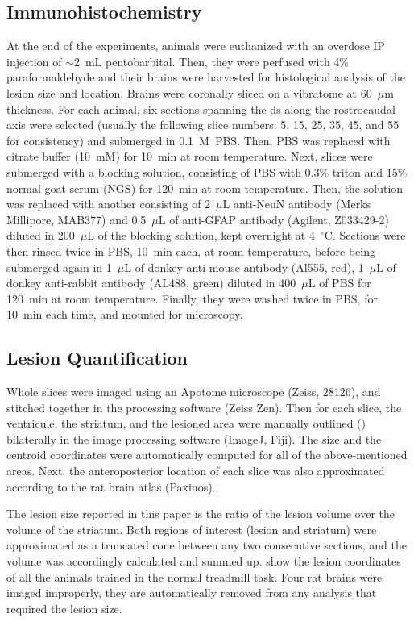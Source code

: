 \subsection{Immunohistochemistry}
At the end of the experiments, animals were euthanized with an overdose IP injection of $\sim$2~mL pentobarbital.
Then, they were perfused with 4\% paraformaldehyde and their brains were harvested for histological analysis of the lesion size and location.
Brains were coronally sliced on a vibratome at 60~$\mu$m thickness.
For each animal, six sections spanning the \gls{ds} along the rostrocaudal axis were selected (usually the following slice numbers: 5, 15, 25, 35, 45, and 55 for consistency) and submerged in 0.1~M~PBS.
Then, PBS was replaced with citrate buffer (10~mM) for 10~min at room temperature.
Next, slices were submerged with a blocking solution, consisting of PBS with 0.3\% triton and 15\% normal goat serum (NGS) for 120~min at room temperature.
Then, the solution was replaced with another consisting of 2~$\mu$L anti-NeuN antibody (Merks Millipore, MAB377) and 0.5~$\mu$L of anti-GFAP antibody (Agilent, Z033429-2) diluted in 200~$\mu$L of the blocking solution, kept overnight at 4~$^{\circ}$C.
Sections were then rinsed twice in PBS, 10~min each, at room temperature, before being submerged again in 1~$\mu$L of donkey anti-mouse antibody (Al555, red), 1~$\mu$L of donkey anti-rabbit antibody (AL488, green) diluted in 400~$\mu$L of PBS for 120~min at room temperature.
Finally, they were washed twice in PBS, for 10~min each time, and mounted for microscopy.

\subsection{Lesion Quantification}
Whole slices were imaged using an Apotome microscope (Zeiss, 28126), and stitched together in the processing software (Zeiss Zen).
Then for each slice, the ventricule, the striatum, and the lesioned area were manually outlined () bilaterally in the image processing software (ImageJ, Fiji).
The size and the centroid coordinates were automatically computed for all of the above-mentioned areas.
Next, the anteroposterior location of each slice was also approximated according to the rat brain atlas (Paxinos).
\par
The lesion size reported in this paper is the ratio of the lesion volume over the volume of the striatum.
Both regions of interest (lesion and striatum) were approximated as a truncated cone between any two consecutive sections, and the volume was accordingly calculated and summed up.
 show the lesion coordinates of all the animals trained in the normal treadmill task.
Four rat brains were imaged improperly, they are automatically removed from any analysis that required the lesion size.


